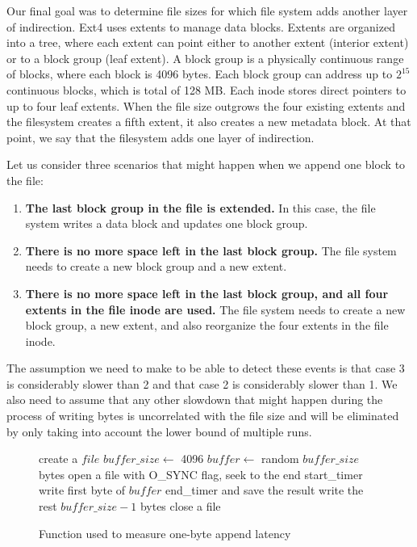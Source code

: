 Our final goal was to determine file sizes for which file system adds another layer of indirection. Ext4 uses extents to manage data blocks. \cite{ext4extents} Extents are organized into a tree, where each extent can point either to another extent (interior extent) or to a block group (leaf extent). A block group is a physically continuous range of blocks, where each block is 4096 bytes. Each block group can address up to $2^{15}$ continuous blocks, which is total of 128 MB. Each inode stores direct pointers to up to four leaf extents. When the file size outgrows the four existing extents and the filesystem creates a fifth extent, it also creates a new metadata block. At that point, we say that the filesystem adds one layer of indirection.


Let us consider three scenarios that might happen when we append one block to the file:
\begin{enumerate}
\item \textbf{The last block group in the file is extended.} In this case, the file system writes a data block and updates one block group.
\item \textbf{There is no more space left in the last block group.} The file system needs to create a new block group and a new extent.
\item \textbf{There is no more space left in the last block group, and all four extents in the file inode are used.} The file system needs to create a new block group, a new extent, and also reorganize the four extents in the file inode.
\end{enumerate}

The assumption we need to make to be able to detect these events is that case 3 is considerably slower than 2 and that case 2 is considerably slower than 1. We also need to assume that any other slowdown that might happen during the process of writing bytes is uncorrelated with the file size and will be eliminated by only taking into account the lower bound of multiple runs.

\begin{figure}[t!]
\begin{algorithmic}
\STATE create a $file$
\STATE $buffer\_size \leftarrow$ 4096
\STATE $buffer \leftarrow$ random $buffer\_size$ bytes
\STATE open a file with O\_SYNC flag, seek to the end
\STATE start\_timer
\STATE write first byte of $buffer$
\STATE end\_timer and save the result
\STATE write the rest $buffer\_size - 1$ bytes
\STATE close a file
\ENDFOR
\end{algorithmic}
\caption{Function used to measure one-byte append latency}
\label{fig:p4pseudo}
\end{figure}

